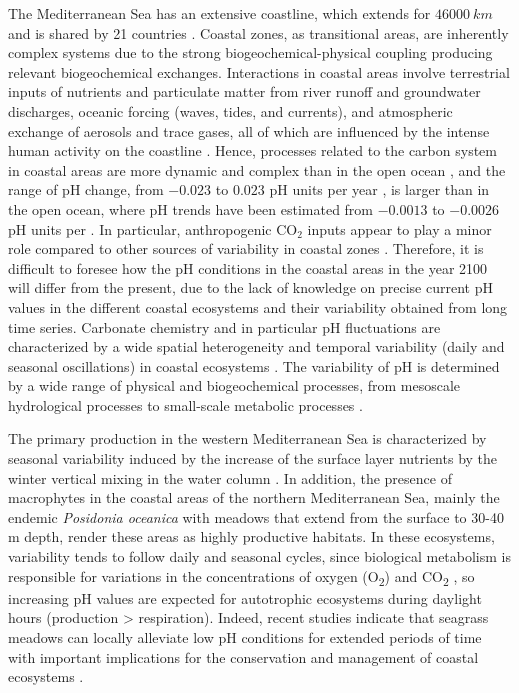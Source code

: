 The Mediterranean Sea has an extensive coastline, which extends for
$\SI{46000}{km}$ and is shared by 21 countries \cite{EEA1999}. Coastal zones,
as transitional areas, are inherently complex systems due to the strong
biogeochemical-physical coupling producing relevant biogeochemical exchanges.
Interactions in coastal areas involve terrestrial inputs of nutrients and
particulate matter from river runoff and groundwater discharges, oceanic
forcing (waves, tides, and currents), and atmospheric exchange of aerosols and
trace gases, all of which are influenced by the intense human activity on
the coastline \cite{crossland2005coastal}. Hence, processes related to the
carbon system in coastal areas are more dynamic and complex than in the open
ocean \cite{Borges2010}, and the range of pH change, from $-0.023$ to
$0.023$ pH units per year \cite{Carstensen2019}, is larger than in the open
ocean, where pH trends have been estimated from $-0.0013$ to $-0.0026$ pH
units per \cite{Bates2014}. In particular, anthropogenic CO$_2$ inputs appear
to play a minor role compared to other sources of variability in coastal
zones \cite{Hofmann2011}. Therefore, it is difficult to foresee how the pH
conditions in the coastal areas in the year 2100 will differ from the present,
due to the lack of knowledge on precise current pH values in the different
coastal ecosystems and their variability obtained from long time series.
Carbonate chemistry and in particular pH fluctuations are characterized by a
wide spatial heterogeneity and temporal variability (daily and seasonal
oscillations) in coastal ecosystems \cite{Hofmann2011,Duarte2013,Mercado2011}.
The variability of pH is determined by a wide range of physical and
biogeochemical processes, from mesoscale hydrological processes to small-scale
metabolic processes \cite{Krause-Jensen2015}.

The primary production in the western Mediterranean Sea is characterized by
seasonal variability induced by the increase of the surface layer nutrients
by the winter vertical mixing in the water column
\cite{goffredo2013mediterranean}. In addition, the presence of
macrophytes \cite{murphy2019world} in the coastal areas of the northern
Mediterranean Sea, mainly the endemic \emph{Posidonia oceanica} with meadows
that extend from the surface to 30-40 m depth, render these areas as highly
productive habitats. In these ecosystems, variability tends to follow daily and
seasonal cycles, since biological metabolism is responsible for variations in
the concentrations of oxygen (O\textsubscript{2}) and CO\textsubscript{2}
\cite{Duarte2013,Hendriks2014}, so increasing pH values are expected for
autotrophic ecosystems during daylight hours (production > respiration).
Indeed, recent studies indicate that seagrass meadows can locally alleviate low
pH conditions for extended periods of time with important implications for the
conservation and management of coastal ecosystems \cite{Ricart2021}.

